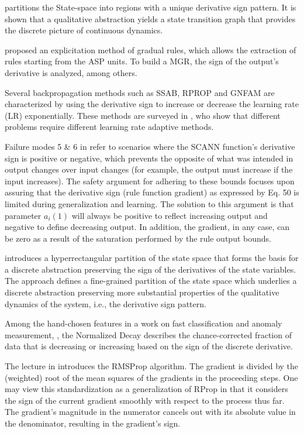 \documentclass[11pt]{book}
\begin{document}
\cite{de2003qualitative} partitions the State-space into regions
with a unique derivative sign pattern. It is shown that a qualitative
abstraction yields a state transition graph that provides the discrete
picture of continuous dynamics.

\cite{salgado2003neuro} proposed an explicitation method of gradual
rules, which allows the extraction of rules starting from the ASP
units. To build a MGR, the sign of the output's derivative is analyzed,
among others.

Several backpropagation methods such as SSAB, RPROP and GNFAM are characterized
by using the derivative sign to increase or decrease the learning
rate (LR) exponentially. These methods are surveyed in \cite{allard2004neural}, who show that different problems require different
learning rate adaptive methods.

Failure modes 5 \& 6 in \cite{kurd2005artificial} refer to scenarios
where the SCANN function's derivative sign is positive or negative,
which prevents the opposite of what was intended in output changes
over input changes (for example, the output must increase if the input
increases). The safety argument for adhering to these bounds focuses
upon assuring that the derivative sign (rule function gradient) as
expressed by Eq. 50 is limited during generalization and learning.
The solution to this argument is that parameter $a_{i}\left(1\right)$
will always be positive to reflect increasing output and negative
to define decreasing output. In addition, the gradient, in any case,
can be zero as a result of the saturation performed by the rule output
bounds.

\cite{batt2008symbolic} introduces a hyperrectangular partition of the state space that forms the basis for a discrete abstraction preserving the sign of the derivatives of the state variables. The approach defines a fine-grained partition of the state
space which underlies a discrete abstraction preserving more substantial
properties of the qualitative dynamics of the system, i.e., the derivative
sign pattern.

Among the hand-chosen features in a work on fast classification and anomaly measurement, \cite{wulsin2011modeling}, the
Normalized Decay describes the chance-corrected fraction of data that
is decreasing or increasing based on the sign of the discrete derivative.

The lecture in \cite{hinton2012neural} introduces the RMSProp algorithm.
The gradient is divided by the (weighted) root of the mean squares
of the gradients in the proceeding steps. One may view this standardization
as a generalization of RProp in that it considers the sign of the
current gradient smoothly with respect to the process thus far. The
gradient's magnitude in the numerator cancels out with its absolute
value in the denominator, resulting in the gradient's sign.
\end{document}

